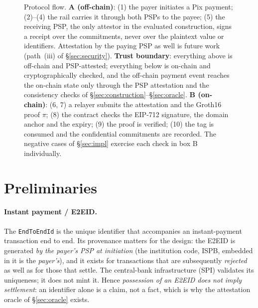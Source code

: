 \documentclass[11pt]{article}
\newcommand{\code}[1]{\texttt{#1}}
\begin{document}
\begin{figure}[h]
\caption{Protocol flow. \textbf{A (off-chain)}: (1) the payer initiates a Pix
payment; (2)--(4) the rail carries it through both PSPs to the payee; (5) the
receiving PSP, the only attestor in the evaluated construction, signs a receipt
over the commitments, never over the plaintext value or identifiers.
Attestation by the paying PSP as well is future work (path~(iii) of
\S\ref{sec:security}). \textbf{Trust boundary}: everything above is off-chain
and PSP-attested; everything below is on-chain and cryptographically checked,
and the off-chain payment event reaches the on-chain state only through the PSP
attestation and the consistency checks of
\S\ref{sec:construction}--\S\ref{sec:oracle}. \textbf{B (on-chain)}: (6, 7) a
relayer submits the attestation and the Groth16 proof $\pi$; (8) the contract
checks the EIP-712 signature, the domain anchor and the expiry; (9) the proof is
verified; (10) the tag is consumed and the confidential commitments are
recorded. The negative cases of \S\ref{sec:impl} exercise each check in box B
individually.}
\label{fig:protocol-flow}
\end{figure}

\section{Preliminaries}
\label{sec:prelim}

\paragraph{Instant payment / E2EID.} The \code{EndToEndId} is the unique
identifier that accompanies an instant-payment transaction end to end. Its
provenance matters for the design: the E2EID is generated \emph{by the payer's
PSP at initiation} (the institution code, ISPB, embedded in it is the
\emph{payer's}), and it exists for transactions that are subsequently
\emph{rejected} as well as for those that settle. The central-bank
infrastructure (SPI) validates its uniqueness; it does not mint it. Hence
\emph{possession of an E2EID does not imply settlement}: an identifier alone is
a claim, not a fact, which is why the attestation oracle of \S\ref{sec:oracle}
exists.
\end{document}
